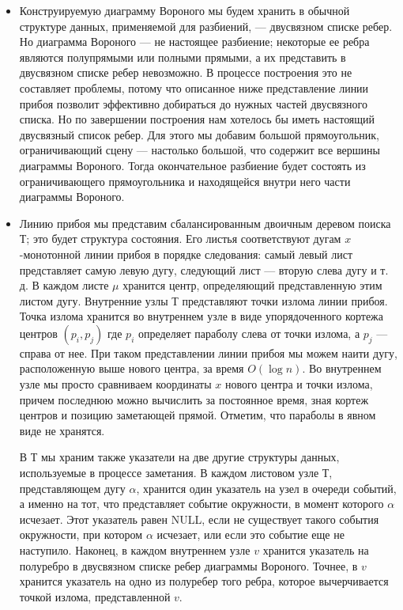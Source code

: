 \begin{itemize}
    \item Конструируемую  диаграмму  Вороного  мы  будем хранить  в  обычной  структуре  данных,  применяемой  для  разбиений, --- двусвязном  списке  ребер.
    Но  диаграмма  Вороного --- не  настоящее  разбиение;  некоторые  ее ребра  являются  полупрямыми  или  полными  прямыми,  а  их  представить  в  двусвязном  списке  ребер невозможно.
    В  процессе  построения  это  не  составляет  проблемы,  потому что  описанное  ниже  представление  линии  прибоя  позволит  эффективно добираться  до  нужных  частей  двусвязного  списка.
    Но  по  завершении  построения  нам  хотелось  бы  иметь  настоящий  двусвязный  список  ребер.
    Для этого  мы  добавим  большой  прямоугольник,  ограничивающий  сцену --- настолько  большой,  что  содержит  все  вершины  диаграммы  Вороного.
    Тогда окончательное  разбиение  будет  состоять  из  ограничивающего  прямоугольника  и  находящейся  внутри  него  части  диаграммы  Вороного.

    \item Линию  прибоя  мы  представим  сбалансированным  двоичным  деревом  поиска  Т;  это  будет  структура  состояния.
    Его  листья  соответствуют  дугам $x$-монотонной  линии  прибоя  в  порядке  следования:  самый  левый  лист представляет  самую  левую  дугу,  следующий  лист  ---  вторую  слева  дугу  и  т.  д. 
    В  каждом  листе  $\mu$  хранится  центр,  определяющий  представленную  этим  листом  дугу.
    Внутренние  узлы  Т  представляют  точки  излома  линии  прибоя. 
    Точка  излома  хранится  во  внутреннем  узле  в  виде  упорядоченного  кортежа центров $(p_i, p_j)$ где $p_i$ определяет  параболу  слева  от  точки  излома,  а $p_j$ --- справа  от  нее.
    При  таком  представлении  линии  прибоя  мы  можем  наити  дугу, расположенную  выше  нового  центра,  за  время $O(\log n)$.
    Во  внутреннем  узле мы  просто  сравниваем  координаты  $x$  нового  центра  и  точки  излома,  причем последнюю  можно  вычислить  за  постоянное  время,  зная  кортеж  центров и  позицию  заметающей  прямой.
    Отметим,  что  параболы  в  явном  виде  не хранятся.
    
    В Т  мы  храним  также  указатели  на  две  другие  структуры  данных,  используемые  в  процессе  заметания.
    В  каждом  листовом  узле  Т,  представляющем дугу  $\alpha$,  хранится  один  указатель  на  узел  в  очереди  событий,  а  именно  на тот,  что  представляет  событие  окружности,  в  момент  которого  $\alpha$  исчезает. 
    Этот  указатель  равен  NULL,  если  не  существует  такого  события  окружности, при  котором  $\alpha$  исчезает,  или  если  это  событие  еще  не  наступило.
    Наконец, в  каждом  внутреннем  узле  $v$  хранится  указатель  на  полуребро  в  двусвязном списке  ребер  диаграммы  Вороного.
    Точнее,  в  $v$  хранится  указатель  на  одно из  полуребер  того  ребра,  которое  вычерчивается  точкой  излома,  представленной $v$.


\end{itemize}
